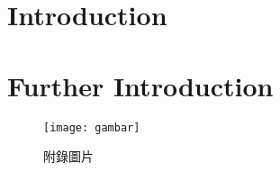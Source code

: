 
\section{Introduction}
\section{Further Introduction}

\clearpage
\renewcommand{\thechapter}{附錄}
\renewcommand{\thefigure}{\Roman{figure}}
\renewcommand{\theequation}{\Roman{equation}}
\renewcommand{\thetable}{\Roman{table}}

\setcounter{equation}{0}
\setcounter{figure}{0}
\setcounter{footnote}{0}
\setcounter{section}{0}
\setcounter{subsection}{0}
\setcounter{subsubsection}{0}
\setcounter{table}{0}


\begin{figure}[h]
  \centerline{\texttt{[image: gambar]}}
  \caption*{附錄圖片}
  \label{fig:figure_2}
\end{figure}